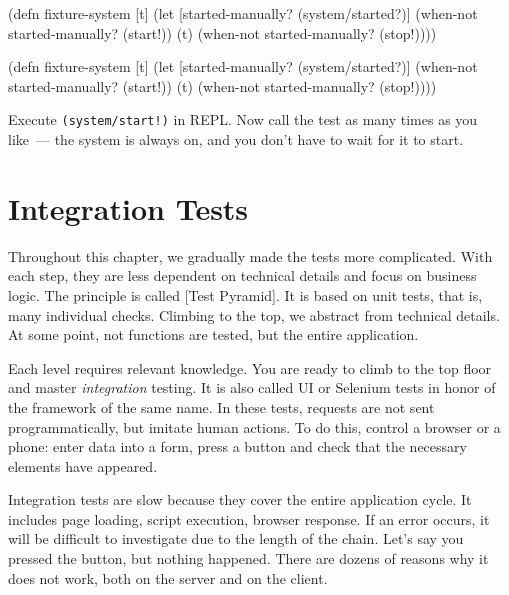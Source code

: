 \begin{english}
  \begin{clojure}
(defn fixture-system [t]
  (let [started-manually?
        (system/started?)]
    (when-not started-manually?
      (start!))
    (t)
    (when-not started-manually?
      (stop!))))
  \end{clojure}
\end{english}

\else

\begin{english}
  \begin{clojure}
(defn fixture-system [t]
  (let [started-manually? (system/started?)]
    (when-not started-manually?
      (start!))
    (t)
    (when-not started-manually?
      (stop!))))
  \end{clojure}
\end{english}

\fi

Execute \verb|(system/start!)| in REPL. Now call the test as many times as you like~--- the system is always on, and you don't have to wait for it to start.

\section{Integration Tests}


Throughout this chapter, we gradually made the tests more complicated. With each step, they are less dependent on technical details and focus on business logic. The principle is called [Test Pyramid]. It is based on unit tests, that is, many individual checks. Climbing to the top, we abstract from technical details. At some point, not functions are tested, but the entire application.


Each level requires relevant knowledge. You are ready to climb to the top floor and master \emph{integration} testing. It is also called UI or Selenium tests in honor of the framework of the same name. In these tests, requests are not sent programmatically, but imitate human actions. To do this, control a browser or a phone: enter data into a form, press a button and check that the necessary elements have appeared.

Integration tests are slow because they cover the entire application cycle. It includes page loading, script execution, browser response. If an error occurs, it will be difficult to investigate due to the length of the chain. Let's say you pressed the button, but
nothing happened. There are dozens of reasons why it does not work, both on the server and on the client.

